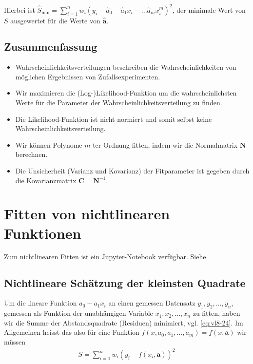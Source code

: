 Hierbei ist $\hat{S}_\text{min} = \sum_{i=1}^n w_i ( y_i - \hat{a}_0 - \hat{a}_1 x_i - ... \hat{a}_m x_i^m)^2$, der minimale Wert von $S$ ausgewertet f\"ur die Werte von $\boldsymbol{\hat{a}}$.


\subsection{Zusammenfassung}
\label{subsec:vl8-6}

\begin{itemize}
    \setlength\itemsep{0em}
        \item Wahrscheinlichkeitsverteilungen beschreiben die Wahrscheinlichkeiten von m\"oglichen Ergebnissen von Zufallsexperimenten.
        \item Wir maximieren die (Log-)Likelihood-Funktion um die wahrscheinlichsten Werte f\"ur die Parameter der Wahrscheinlichkeitsverteilung zu finden.
        \item Die Likelihood-Funktion ist nicht normiert und somit selbst keine Wahrscheinlichkeitsverteilung.
        \item Wir k\"onnen Polynome $m$-ter Ordnung fitten, indem wir die Normalmatrix $\boldsymbol{N}$ berechnen.
        \item Die Unsicherheit (Varianz und Kovarianz) der Fitparameter ist gegeben durch die Kovarianzmatrix $\boldsymbol{C} = \boldsymbol{N}^{-1}$.
\end{itemize}

\section{Fitten von nichtlinearen Funktionen}\label{sec:nonLinearFit}
\begin{center}
\begin{tcolorbox}[enhanced,width=6in,center upper,
    fontupper=\large,drop fuzzy shadow southwest,
    colframe=blue!50!black,colback=blue!10]
    {Zum nichtlinearen Fitten ist ein Jupyter-Notebook verfügbar. Siehe  }
\end{tcolorbox}
\end{center}

\subsection{Nichtlineare Sch\"atzung der kleinsten Quadrate}
\label{subsec:vl9}

Um die lineare Funktion $a_0 - a_1 x_i$ an einen gemessen Datensatz $y_1, y_2, ..., y_n$, gemessen als Funktion der unabh\"angigen Variable $x_1, x_2, ..., x_n$ zu fitten, haben wir die Summe der Abstandsquadrate (Residuen) minimiert, vgl. \cref{eq:vl8-24}. Im Allgemeinen heisst das also f\"ur eine Funktion $f(x, a_0, a_1, ..., a_m) = f(x, \boldsymbol{a})$ wir m\"ussen
\begin{align}
S = \sum_{i=1}^n w_i (y_i - f(x_i, \boldsymbol{a}) )^2
\label{eq:vl9-1}
\end{align}

